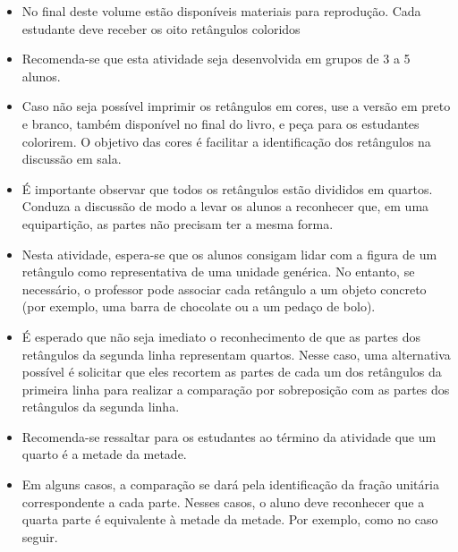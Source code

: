 \documentclass[10 pt,usenames,dvipsnames, oneside]{article}
\begin{document}
\begin{goals}
\begin{enumerate}
\end{enumerate}
\tcblower
\tikzset{x=1cm, y=1cm}
  \begin{itemize} %
    \item No final deste volume estão disponíveis materiais para reprodução. Cada estudante deve receber os oito retângulos coloridos
    \item Recomenda-se que esta atividade seja desenvolvida em grupos de 3 a 5 alunos.
    \item Caso não seja possível imprimir os retângulos em cores, use a versão em preto e branco, também disponível no final do livro, e peça para os estudantes colorirem. O objetivo das cores é facilitar a identificação dos retângulos na discussão em sala.
    \item É importante observar que todos os retângulos estão divididos em quartos. Conduza a discussão de modo a levar os alunos a reconhecer que, em uma equipartição, as partes não precisam ter a mesma forma.
    \item Nesta atividade, espera-se que os alunos consigam lidar com a figura de um retângulo como representativa de uma unidade genérica.  No entanto, se necessário, o professor pode associar cada retângulo a um objeto concreto (por exemplo, uma barra de chocolate ou a um pedaço de bolo).
    \item É esperado que não seja imediato o reconhecimento de que as partes dos retângulos da segunda linha representam quartos. Nesse caso,  uma alternativa possível é solicitar que eles recortem as partes de cada um dos retângulos da primeira linha para realizar a comparação por sobreposição com as partes dos retângulos da segunda linha.
   \item Recomenda-se ressaltar para os estudantes ao término da atividade que um quarto é a metade da metade.
    \item Em alguns casos, a comparação se dará pela identificação da fração unitária correspondente a cada parte. Nesses casos, o aluno deve reconhecer que a quarta parte é equivalente à metade da metade. Por exemplo, como no caso seguir.
 \begin{center}
\end{center}



\end{itemize}
\end{goals}
\end{document}
